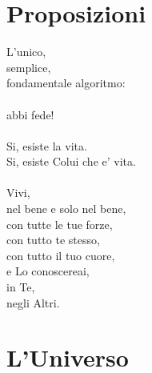 \section{Proposizioni}

\begin{haiku}
    L'unico,\\
    semplice,\\
    fondamentale algoritmo:\\
    \leavevmode\\
    \hspace{5mm} abbi fede!\\
    \leavevmode\\
    Si, esiste la vita.\\
    Si, esiste Colui che e' vita.\\
    \leavevmode\\
    Vivi,\\
    nel bene e solo nel bene,\\
    con tutte le tue forze,\\
    con tutto te stesso,\\
    con tutto il tuo cuore,\\
    e Lo conoscereai,\\
    in Te,\\
    negli Altri.\\
\end{haiku}


\section{L'Universo}

